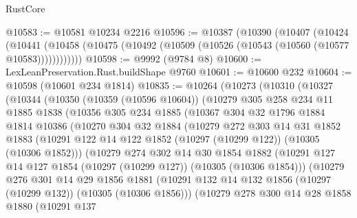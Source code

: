 \begin{lexlean}{RustCore}
\begin{coremodule}
@10583 := @10581 @10234 @2216
@10596 := @10387
    (@10390
      (@10407
        (@10424
          (@10441 (@10458 (@10475 (@10492 (@10509 (@10526 (@10543 (@10560 (@10577 @10583))))))))))))
@10598 := @9992 (@9784 @8)
@10600 := LexLeanPreservation.Rust.buildShape @9760
@10601 := @10600 @232
@10604 := @10598 (@10601 @234 @1814)
@10835 := @10264
    (@10273
      (@10310
        (@10327
          (@10344
            (@10350
              (@10359 (@10596 @10604))
              (@10279
                @305
                @258
                @234
                @11
                @1885
                @1838
                (@10356
                  @305
                  @234
                  @1885
                  (@10367
                    @304
                    @32
                    @1796
                    @1884
                    @1814
                    @10386
                    (@10270
                      @304
                      @32
                      @1884
                      (@10279
                        @272
                        @303
                        @14
                        @31
                        @1852
                        @1883
                        (@10291 @122 @14 @122 @1852 (@10297 (@10299 @122)) (@10305 (@10306 @1852)))
                        (@10279
                          @274
                          @302
                          @14
                          @30
                          @1854
                          @1882
                          (@10291
                            @127
                            @14
                            @127
                            @1854
                            (@10297 (@10299 @127))
                            (@10305 (@10306 @1854)))
                          (@10279
                            @276
                            @301
                            @14
                            @29
                            @1856
                            @1881
                            (@10291
                              @132
                              @14
                              @132
                              @1856
                              (@10297 (@10299 @132))
                              (@10305 (@10306 @1856)))
                            (@10279
                              @278
                              @300
                              @14
                              @28
                              @1858
                              @1880
                              (@10291
                                @137

\end{coremodule}
\end{lexlean}
